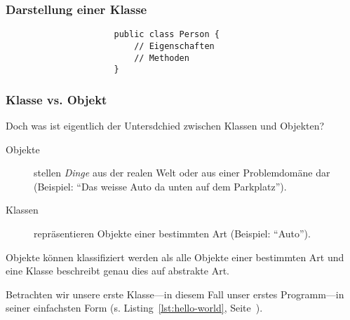\begin{frame}[fragile]
    \frametitle<presentation>{Darstellung einer Klasse}

    \begin{figure}[ht]
        \centering
        \begin{minipage}[b]{0.5\textwidth}
            \centering
        \end{minipage}
        \begin{minipage}[b]{0.4\textwidth}
            \begin{verbatim}
                public class Person {
                    // Eigenschaften
                    // Methoden
                }
            \end{verbatim}
        \end{minipage}
        \label{fig:uml-class}
    \end{figure}

\end{frame}


\begin{frame}[fragile]
    \frametitle<presentation>{Klasse vs. Objekt}

    Doch was ist eigentlich der Untersdchied zwischen Klassen und Objekten?

    \begin{description}
        \item[Objekte] stellen \emph{Dinge} aus der realen Welt oder aus einer Problemdomäne
        dar (Beispiel: ``Das weisse Auto da unten auf dem Parkplatz'').
        \item[Klassen] repräsentieren Objekte einer bestimmten Art (Beispiel: ``Auto'').
    \end{description}

\end{frame}

Objekte können klassifiziert werden als alle Objekte einer bestimmten Art und
eine Klasse beschreibt genau dies auf abstrakte Art.

Betrachten wir unsere erste Klasse---in diesem Fall unser erstes Programm---in
seiner einfachsten Form (s. Listing~\ref{lst:hello-world}, Seite~\pageref{lst:hello-world}).

